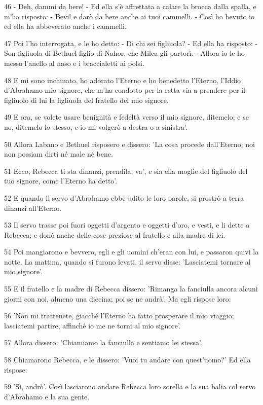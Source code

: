 \par 46 - Deh, dammi da bere! - Ed ella s'è affrettata a calare la brocca dalla spalla, e m'ha risposto: - Bevi! e darò da bere anche ai tuoi cammelli. - Così ho bevuto io ed ella ha abbeverato anche i cammelli.
\par 47 Poi l'ho interrogata, e le ho detto: - Di chi sei figliuola? - Ed ella ha risposto: - Son figliuola di Bethuel figlio di Nahor, che Milca gli partorì. - Allora io le ho messo l'anello al naso e i braccialetti ai polsi.
\par 48 E mi sono inchinato, ho adorato l'Eterno e ho benedetto l'Eterno, l'Iddio d'Abrahamo mio signore, che m'ha condotto per la retta via a prendere per il figliuolo di lui la figliuola del fratello del mio signore.
\par 49 E ora, se volete usare benignità e fedeltà verso il mio signore, ditemelo; e se no, ditemelo lo stesso, e io mi volgerò a destra o a sinistra'.
\par 50 Allora Labano e Bethuel risposero e dissero: 'La cosa procede dall'Eterno; noi non possiam dirti né male né bene.
\par 51 Ecco, Rebecca ti sta dinanzi, prendila, va', e sia ella moglie del figliuolo del tuo signore, come l'Eterno ha detto'.
\par 52 E quando il servo d'Abrahamo ebbe udito le loro parole, si prostrò a terra dinanzi all'Eterno.
\par 53 Il servo trasse poi fuori oggetti d'argento e oggetti d'oro, e vesti, e li dette a Rebecca; e donò anche delle cose preziose al fratello e alla madre di lei.
\par 54 Poi mangiarono e bevvero, egli e gli uomini ch'eran con lui, e passaron quivi la notte. La mattina, quando si furono levati, il servo disse: 'Lasciatemi tornare al mio signore'.
\par 55 E il fratello e la madre di Rebecca dissero: 'Rimanga la fanciulla ancora alcuni giorni con noi, almeno una diecina; poi se ne andrà'. Ma egli rispose loro:
\par 56 'Non mi trattenete, giacché l'Eterno ha fatto prosperare il mio viaggio; lasciatemi partire, affinché io me ne torni al mio signore'.
\par 57 Allora dissero: 'Chiamiamo la fanciulla e sentiamo lei stessa'.
\par 58 Chiamarono Rebecca, e le dissero: 'Vuoi tu andare con quest'uomo?' Ed ella rispose:
\par 59 'Sì, andrò'. Così lasciarono andare Rebecca loro sorella e la sua balia col servo d'Abrahamo e la sua gente.
